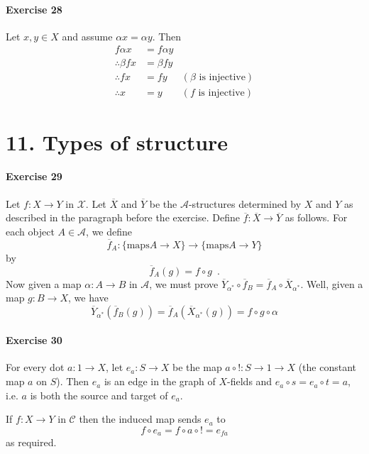 \documentclass{report}
\begin{document}
    \paragraph{Exercise 28}
    Let $x, y \in X$ and assume $\alpha x = \alpha y$. Then
    \begin{align*}
        f \alpha x & = f \alpha y \\
        \therefore \beta f x & = \beta f y \\
        \therefore f x & = f y & (\text{$\beta$ is injective}) \\
        \therefore x & = y & (\text{$f$ is injective})
    \end{align*}

    \section{11. Types of structure}

    \paragraph{Exercise 29}
    Let $f : X \rightarrow Y$ in $\mathcal{X}$. Let $\overline{X}$ and $\overline{Y}$ be the
    $\mathcal{A}$-structures determined by $X$ and $Y$ as described in the paragraph before the exercise.
    Define $\overline{f} : \overline{X} \rightarrow \overline{Y}$ as follows. For each object $A \in
    \mathcal{A}$, we define
    \[ \overline{f}_A : \{ \text{maps} A \rightarrow X \} \rightarrow \{ \text{maps} A \rightarrow Y \} \]
    by
    \[ \overline{f}_A(g) = f \circ g \enspace . \]
    Now given a map $\alpha : A \rightarrow B$ in $\mathcal{A}$, we must prove
    $\overline{Y}_{\alpha^*} \circ \overline{f}_B =
    \overline{f}_A \circ \overline{X}_{\alpha^*}$. Well, given a map $g : B \rightarrow X$, we have
    \[ \overline{Y}_{\alpha^*}(\overline{f}_B(g)) = \overline{f}_A(\overline{X}_{\alpha^*}(g)) = f \circ g \circ \alpha \]

    \paragraph{Exercise 30}
    For every dot $a : 1 \rightarrow X$, let $e_a : S \rightarrow X$ be the map $a \circ ! : S \rightarrow 1
    \rightarrow X$ (the constant map $a$ on $S$). Then $e_a$ is an edge in the graph of $X$-fields
    and $e_a \circ s = e_a \circ t = a$, i.e. $a$ is both the source and target of $e_a$.

    If $f : X \rightarrow Y$ in $\mathcal{C}$ then the induced map sends $e_a$ to
    \[ f \circ e_a = f \circ a \circ ! = e_{fa} \]
    as required.
\end{document}

